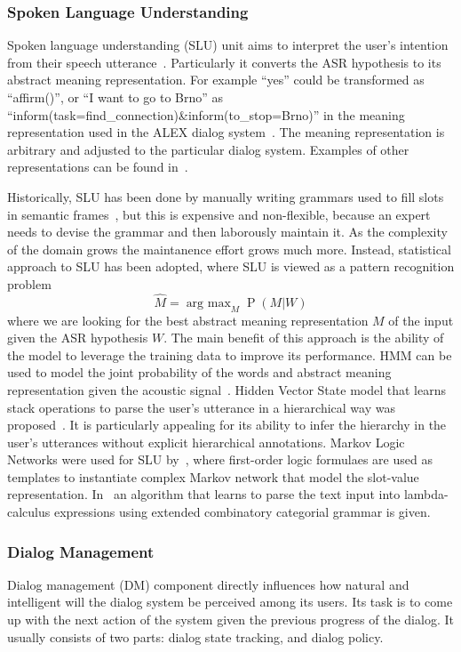 \documentclass[10pt,twocolumn]{article}
\begin{document}
\subsubsection{Spoken Language Understanding}
Spoken language understanding (SLU) unit aims to interpret the user's intention from their speech utterance~\cite{wang2005spoken}. Particularly it converts the ASR hypothesis to its abstract meaning representation. For example ``yes'' could be transformed as ``affirm()'', or ``I want to go to Brno'' as ``inform(task=find\_connection)\&inform(to\_stop=Brno)'' in the meaning representation used in the ALEX dialog system~\cite{duvsek2014alex}. The meaning representation is arbitrary and adjusted to the particular dialog system. Examples of other representations can be found in~\cite{skantze2008galatea,he2003data}.

Historically, SLU has been done by manually writing grammars used to fill slots in semantic frames~\cite{ward1994recent,dowding1993gemini}, but this is expensive and non-flexible, because an expert needs to devise the grammar and then laborously maintain it. As the complexity of the domain grows the maintanence effort grows much more. Instead, statistical approach to SLU has been adopted, where SLU is viewed as a pattern recognition problem
$$\hat M=\operatorname{arg~max}_M \operatorname{P}(M|W)$$
where we are looking for the best abstract meaning representation $M$ of the input given the ASR hypothesis $W$. The main benefit of this approach is the ability of the model to leverage the training data to improve its performance. HMM can be used to model the joint probability of the words and abstract meaning representation given the acoustic signal~\cite{pieraccini1992progress,pieraccini1992stochastic}. Hidden Vector State model that learns stack operations to parse the user's utterance in a hierarchical way was proposed~\cite{he2003data}. It is particularly appealing for its ability to infer the hierarchy in the user's utterances without explicit hierarchical annotations. Markov Logic Networks were used for SLU by~\cite{meza2008spoken}, where first-order logic formulaes are used as templates to instantiate complex Markov network that model the slot-value representation. In~\cite{zettlemoyer2007online} an algorithm that learns to parse the text input into lambda-calculus expressions using extended combinatory categorial grammar is given.

\subsubsection{Dialog Management}
Dialog management (DM) component directly influences how natural and intelligent will the dialog system be perceived among its users. Its task is to come up with the next action of the system given the previous progress of the dialog. It usually consists of two parts: dialog state tracking, and dialog policy.
\end{document}

